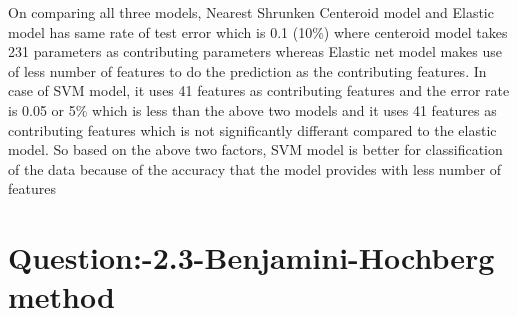 \documentclass[]{article}
\newenvironment{Shaded}{\begin{snugshade}}{\end{snugshade}}
\newcommand{\KeywordTok}[1]{\textcolor[rgb]{0.13,0.29,0.53}{\textbf{#1}}}
\newcommand{\DataTypeTok}[1]{\textcolor[rgb]{0.13,0.29,0.53}{#1}}
\newcommand{\DecValTok}[1]{\textcolor[rgb]{0.00,0.00,0.81}{#1}}
\newcommand{\FloatTok}[1]{\textcolor[rgb]{0.00,0.00,0.81}{#1}}
\newcommand{\StringTok}[1]{\textcolor[rgb]{0.31,0.60,0.02}{#1}}
\newcommand{\CommentTok}[1]{\textcolor[rgb]{0.56,0.35,0.01}{\textit{#1}}}
\newcommand{\ControlFlowTok}[1]{\textcolor[rgb]{0.13,0.29,0.53}{\textbf{#1}}}
\newcommand{\OperatorTok}[1]{\textcolor[rgb]{0.81,0.36,0.00}{\textbf{#1}}}
\newcommand{\NormalTok}[1]{#1}
\begin{document}
On comparing all three models, Nearest Shrunken Centeroid model and
Elastic model has same rate of test error which is 0.1 (10\%) where
centeroid model takes 231 parameters as contributing parameters whereas
Elastic net model makes use of less number of features to do the
prediction as the contributing features. In case of SVM model, it uses
41 features as contributing features and the error rate is 0.05 or 5\%
which is less than the above two models and it uses 41 features as
contributing features which is not significantly differant compared to
the elastic model. So based on the above two factors, SVM model is
better for classification of the data because of the accuracy that the
model provides with less number of features

\section{Question:-2.3-Benjamini-Hochberg
method}\label{question-2.3-benjamini-hochberg-method}

\begin{Shaded}
\end{Shaded}
\end{document}
